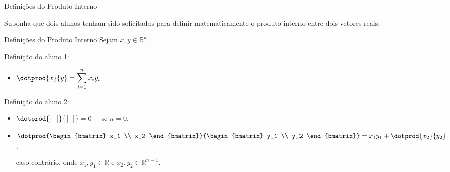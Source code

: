 
\begin{frame}{Definições do Produto Interno}
  \begin{center}
    Suponha que dois alunos tenham sido solicitados para definir matematicamente o produto interno entre dois vetores reais.
  \end{center}
\end{frame}

\begin{frame}{Definições do Produto Interno}
  Sejam $x, y \in \mathbb{R}^n$.

  \pause

  \vfill

  \begin{minipage}[t]{0.45\textwidth}
    Definição do aluno 1:
    \vspace{0.5cm}
    \begin{itemize}
      \item $\dotprod{x}{y} = \displaystyle\sum_{i=1}^{n} x_i y_i$
    \end{itemize}
  \end{minipage}
  \pause
  \hfill
  \vrule
  \hfill
  \begin{minipage}[t]{0.50\textwidth}
    Definição do aluno 2:
    \vspace{0.5cm}
    \begin{itemize}
      \item $\dotprod{\begin{bmatrix} \hphantom{a} \end{bmatrix}}{\begin{bmatrix} \hphantom{a} \end{bmatrix}} = 0 \quad$ se $n = 0$. \pause
      \vspace{0.5cm}
      \item $\dotprod{\begin{bmatrix} x_1 \\ x_2 \end{bmatrix}}{\begin{bmatrix} y_1 \\ y_2 \end{bmatrix}} = x_1 y_1 + \dotprod{x_2}{y_2}$,

      \vspace{0.3cm}
      caso contrário, onde $x_1, y_1 \in \mathbb{R}$ e $x_2, y_2 \in \mathbb{R}^{n-1}$.
    \end{itemize}
  \end{minipage}
  \vfill
\end{frame}

